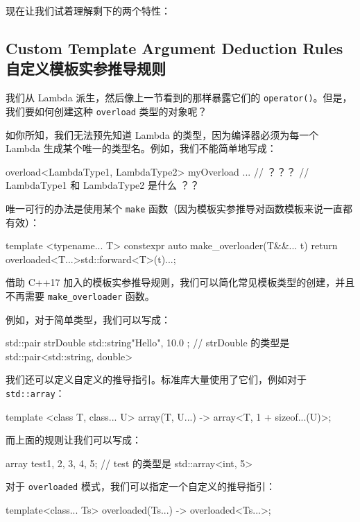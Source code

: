 现在让我们试着理解剩下的两个特性：

\subsection{Custom Template Argument Deduction Rules 自定义模板实参推导规则}

我们从 Lambda 派生，然后像上一节看到的那样暴露它们的 \texttt{operator()}。但是，我们要如何创建这种 \texttt{overload} 类型的对象呢？

如你所知，我们无法预先知道 Lambda 的类型，因为编译器必须为每一个 Lambda 生成某个唯一的类型名。例如，我们不能简单地写成：

\begin{codebox}
overload<LambdaType1, LambdaType2> myOverload { ... } // ？？？
// LambdaType1 和 LambdaType2 是什么 ？？
\end{codebox}

唯一可行的办法是使用某个 \texttt{make} 函数（因为模板实参推导对函数模板来说一直都有效）：

\begin{codebox}
template <typename... T>
constexpr auto make_overloader(T&&... t) {
return overloaded<T...>{std::forward<T>(t)...};
}
\end{codebox}

借助 C++17 加入的模板实参推导规则，我们可以简化常见模板类型的创建，并且不再需要 \texttt{make\_overloader} 函数。

例如，对于简单类型，我们可以写成：

\begin{codebox}
std::pair strDouble { std::string{"Hello"}, 10.0 };
// strDouble 的类型是 std::pair<std::string, double>
\end{codebox}

我们还可以定义自定义的推导指引。标准库大量使用了它们，例如对于 \texttt{std::array}：

\begin{codebox}
template <class T, class... U>
array(T, U...) -> array<T, 1 + sizeof...(U)>;
\end{codebox}

而上面的规则让我们可以写成：

\begin{codebox}
array test{1, 2, 3, 4, 5};
// test 的类型是 std::array<int, 5>
\end{codebox}

对于 \texttt{overloaded} 模式，我们可以指定一个自定义的推导指引：

\begin{codebox}
template<class... Ts> overloaded(Ts...) -> overloaded<Ts...>;
\end{codebox}

